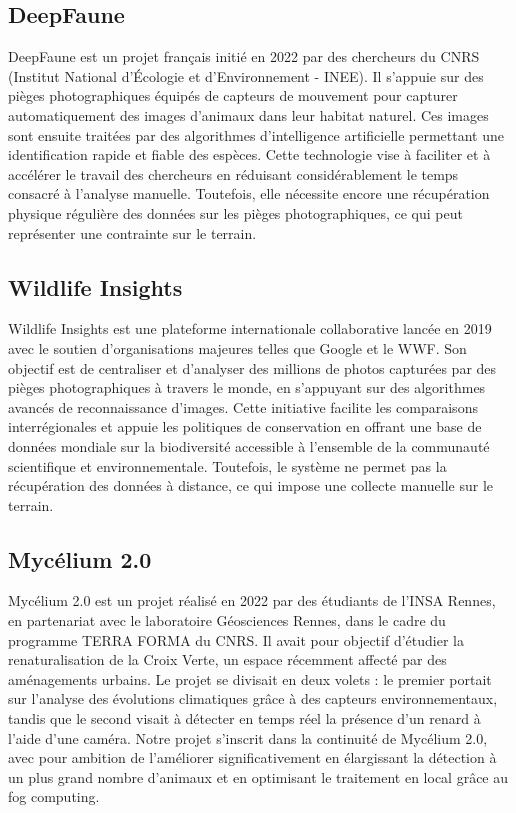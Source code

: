 \documentclass[a4paper,11pt]{article}
\begin{document}
	\subsection{DeepFaune}
	DeepFaune est un projet français initié en 2022 par des chercheurs du CNRS (Institut National d’Écologie et d’Environnement - INEE). Il s’appuie sur des pièges photographiques équipés de capteurs de mouvement pour capturer automatiquement des images d’animaux dans leur habitat naturel. Ces images sont ensuite traitées par des algorithmes d’intelligence artificielle permettant une identification rapide et fiable des espèces. Cette technologie vise à faciliter et à accélérer le travail des chercheurs en réduisant considérablement le temps consacré à l’analyse manuelle. Toutefois, elle nécessite encore une récupération physique régulière des données sur les pièges photographiques, ce qui peut représenter une contrainte sur le terrain.
	\subsection{Wildlife Insights}
	Wildlife Insights est une plateforme internationale collaborative lancée en 2019 avec le soutien d'organisations majeures telles que Google et le WWF. Son objectif est de centraliser et d’analyser des millions de photos capturées par des pièges photographiques à travers le monde, en s’appuyant sur des algorithmes avancés de reconnaissance d’images. Cette initiative facilite les comparaisons interrégionales et appuie les politiques de conservation en offrant une base de données mondiale sur la biodiversité accessible à l’ensemble de la communauté scientifique et environnementale. Toutefois, le système ne permet pas la récupération des données à distance, ce qui impose une collecte manuelle sur le terrain.
	\subsection{Mycélium 2.0}
	Mycélium 2.0 est un projet réalisé en 2022 par des étudiants de l’INSA Rennes, en partenariat avec le laboratoire Géosciences Rennes, dans le cadre du programme TERRA FORMA du CNRS. Il avait pour objectif d’étudier la renaturalisation de la Croix Verte, un espace récemment affecté par des aménagements urbains. Le projet se divisait en deux volets : le premier portait sur l’analyse des évolutions climatiques grâce à des capteurs environnementaux, tandis que le second visait à détecter en temps réel la présence d’un renard à l’aide d’une caméra. Notre projet s’inscrit dans la continuité de Mycélium 2.0, avec pour ambition de l'améliorer significativement en élargissant la détection à un plus grand nombre d'animaux et en optimisant le traitement en local grâce au fog computing.
\end{document}
